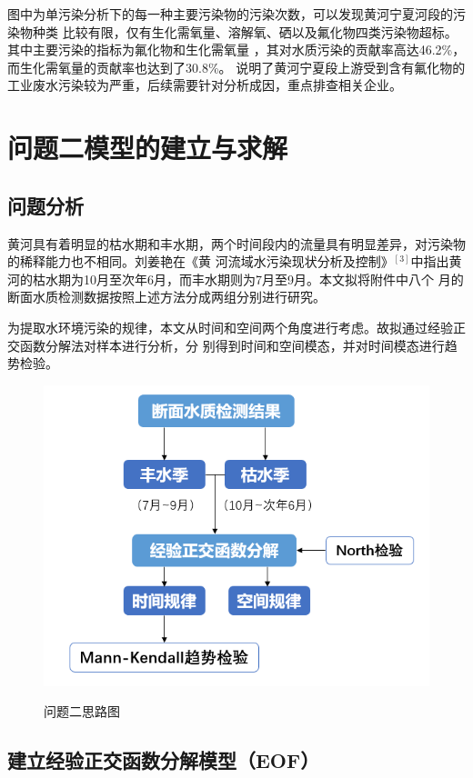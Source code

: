 \documentclass{whutmod}
\begin{document}
\begin{spacing}{1.2}
图中为单污染分析下的每一种主要污染物的污染次数，可以发现黄河宁夏河段的污染物种类
比较有限，仅有生化需氧量、溶解氧、硒以及氟化物四类污染物超标。其中主要污染的指标为氟化物和生化需氧量
，其对水质污染的贡献率高达46.2\%，而生化需氧量的贡献率也达到了30.8\%。
说明了黄河宁夏段上游受到含有氟化物的工业废水污染较为严重，后续需要针对分析成因，重点排查相关企业。

\section{问题二模型的建立与求解}



\subsection{问题分析}

黄河具有着明显的枯水期和丰水期，两个时间段内的流量具有明显差异，对污染物的稀释能力也不相同。刘姜艳在《黄
河流域水污染现状分析及控制》$^{[3]}$中指出黄河的枯水期为10月至次年6月，而丰水期则为7月至9月。本文拟将附件中八个
月的断面水质检测数据按照上述方法分成两组分别进行研究。

为提取水环境污染的规律，本文从时间和空间两个角度进行考虑。故拟通过经验正交函数分解法对样本进行分析，分
别得到时间和空间模态，并对时间模态进行趋势检验。

\begin{figure}[H]
	\centering
	\includegraphics[width=.8\textwidth]{问题二思路图.png}
	\label{问题二思路图}
	\caption{问题二思路图}
\end{figure}



\subsection{建立经验正交函数分解模型（EOF）}


\end{spacing}
\end{document}
